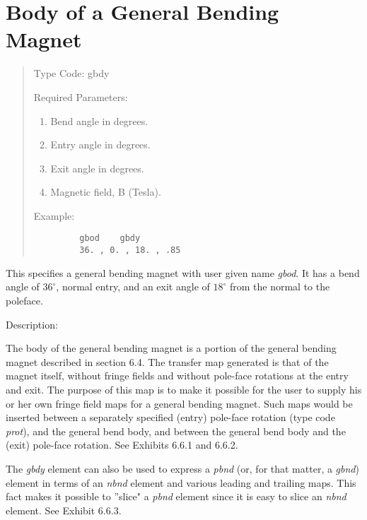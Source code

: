 \section{Body of a General Bending Magnet}
\begin{quotation}
\noindent Type Code:  gbdy
\vspace{5mm}

\noindent Required Parameters:
\begin{enumerate}
  \item  Bend angle in degrees.
  \item  Entry angle in degrees.
  \item  Exit angle in degrees.
  \item  Magnetic field, B (Tesla).
\end{enumerate}

\vspace{5mm}
\noindent Example:
\begin{verbatim}
         gbod    gbdy
         36. , 0. , 18. , .85
\end{verbatim}
\end{quotation}
This specifies a general bending magnet with user given name {\em gbod}.  It has
a bend angle of $36^\circ$, normal entry, and an exit angle of $18^\circ$
from the normal to the poleface.

\vspace{5mm}
       Description:
\vspace{2mm}

         The body of the general bending magnet is a portion of the general
bending magnet described in section 6.4. 
  The transfer map generated is
that of the magnet itself, without fringe fields and without pole-face rotations at the entry and exit.  The purpose of this map is to make it possible for the user to
supply his or her own fringe field maps for a general bending magnet.  Such
maps would be inserted between a separately specified (entry) pole-face
rotation (type code {\em prot}\/), and the general bend body, and between the
general bend body and the (exit) pole-face rotation.  See Exhibits 6.6.1 and 6.6.2.

The {\em gbdy} element can also be used to express a {\em pbnd} (or, for
that matter, a {\em gbnd}) element in terms of an {\em nbnd} element and
various leading and trailing maps.  This fact makes it possible to
''slice" a {\em pbnd} element since it is easy to slice an {\em nbnd}
element.  See Exhibit 6.6.3.

